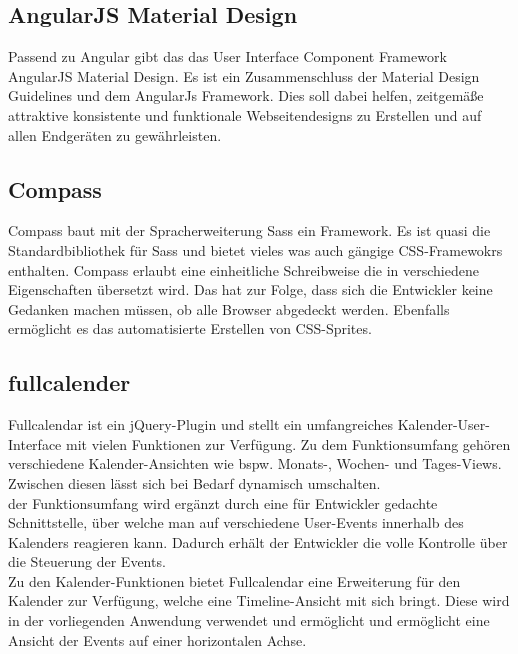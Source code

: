 \subsection{AngularJS Material Design}
Passend zu Angular gibt das das User Interface Component Framework AngularJS Material Design. Es ist ein Zusammenschluss der Material Design Guidelines und dem AngularJs Framework. Dies soll dabei helfen, zeitgemäße attraktive konsistente und funktionale  Webseitendesigns zu Erstellen und auf allen Endgeräten zu gewährleisten.

\subsection{Compass}
Compass baut mit der Spracherweiterung Sass ein Framework. Es ist quasi die Standardbibliothek für Sass und bietet vieles was auch gängige CSS-Framewokrs enthalten. Compass erlaubt eine einheitliche Schreibweise die in verschiedene Eigenschaften übersetzt wird. Das hat zur Folge, dass sich die Entwickler keine Gedanken machen müssen, ob alle Browser abgedeckt werden. Ebenfalls ermöglicht es das automatisierte Erstellen von CSS-Sprites. 

\subsection{fullcalender}
Fullcalendar ist ein jQuery-Plugin und stellt ein umfangreiches Kalender-User-Interface mit vielen Funktionen zur Verfügung. Zu dem Funktionsumfang gehören verschiedene Kalender-Ansichten wie bspw. Monats-, Wochen- und Tages-Views. Zwischen diesen lässt sich bei Bedarf dynamisch umschalten.\\
der Funktionsumfang wird ergänzt durch eine für Entwickler gedachte Schnittstelle, über welche man auf verschiedene User-Events innerhalb des Kalenders reagieren kann. Dadurch erhält der Entwickler die volle Kontrolle über die Steuerung der Events.\\
Zu den Kalender-Funktionen bietet Fullcalendar eine Erweiterung für den Kalender zur Verfügung, welche eine Timeline-Ansicht mit sich bringt. Diese wird in der vorliegenden Anwendung verwendet und ermöglicht und ermöglicht eine Ansicht der Events auf einer horizontalen Achse.

